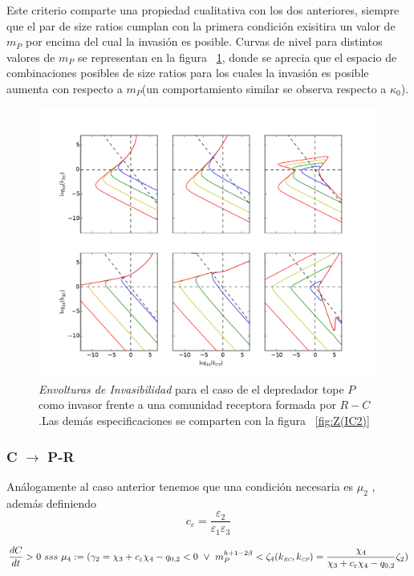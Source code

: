 Este criterio comparte una propiedad cualitativa con los dos anteriores, siempre que el par de size ratios cumplan con la primera condici\'on exisitira un valor de $m_P$ por encima del cual la invasi\'on es posible. Curvas de nivel para distintos valores de $m_P$ se representan en la figura ~\ref{fig:Z(IC4)}, donde se aprecia que el espacio de combinaciones posibles de size ratios para los cuales la invasi\'on es posible aumenta con respecto a $m_P$(un comportamiento similar se observa respecto a $\kappa_0$).


\begin{figure}
  \centering
  \includegraphics[width = 0.99\textwidth]{./Plots/Z(IC4)AcGrGr.pdf}
  \caption[Env $Z(IC4)$]{\emph{Envolturas de Invasibilidad} para el caso de el depredador tope $P$ como invasor frente a una comunidad receptora formada por $R-C$ .Las dem\'as especificaciones se comparten con la figura ~\ref{fig:Z(IC2)}}
  \label{fig:Z(IC4)}
\end{figure}


\subsubsection{C $\to$ P-R}
An\'alogamente al caso anterior tenemos que una condici\'on necesaria es $\mu_2$ , adem\'as definiendo
\begin{equation}
  c_\varepsilon = \frac{\varepsilon_2}{\varepsilon_1\varepsilon_3}
\end{equation}

\begin{equation}
\frac{dC}{dt}  >0 \ sss \ \mu_4 := (\gamma_2 = \chi_3 + c_\varepsilon \chi_4 - q_{0,2} < 0 \ \lor \  m_P^{h + 1 - 2\beta} < \zeta_4(k_{\textit{\tiny RC}},k_{\textit{\tiny CP}}) = \frac{\chi_4}{\chi_3 + c_\varepsilon \chi_4 - q_{0,2}} \zeta_2 )
\end{equation}


